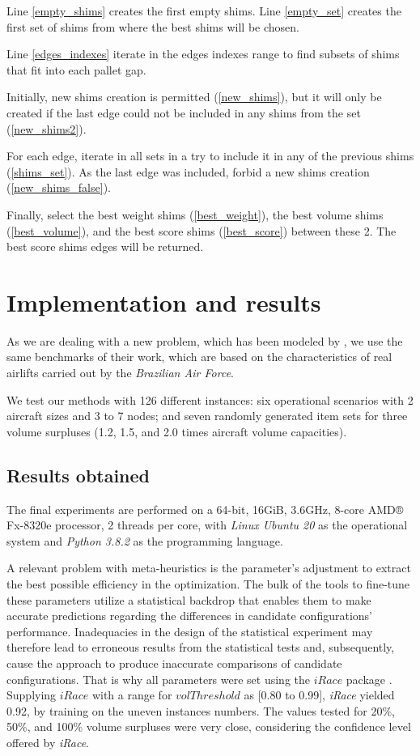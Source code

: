 \documentclass[preprint,authoryear]{elsarticle}
\begin{document}
Line \ref{empty_shims} creates the first empty shims.
Line \ref{empty_set} creates the first set of shims from where the best shims will be chosen.

Line \ref{edges_indexes} iterate in the edges indexes range to find subsets of shims that fit into each pallet gap.

Initially, new shims creation is permitted (\ref{new_shims}), but it will only be created if the last edge could not be included in any shims from the set (\ref{new_shims2}). 

For each edge, iterate in all sets in a try to include it in any of the previous shims (\ref{shims_set}).
As the last edge was included, forbid a new shims creation (\ref{new_shims_false}).

Finally, select the best weight shims (\ref{best_weight}), the best volume shims (\ref{best_volume}), and the best score shims (\ref{best_score}) between these 2. The best score shims edges will be returned.



\section{Implementation and results}
\label{sec6}


As we are dealing with a new problem, which has been modeled by \cite{MesquitaSanches2023}, we use the same benchmarks of their work, which are based on the characteristics of real airlifts carried out by the {\em Brazilian Air Force}.
 
We test our methods with 126 different instances: six operational scenarios with 2 aircraft sizes and 3 to 7 nodes; and seven randomly generated item sets for three volume surpluses (1.2, 1.5, and 2.0 times aircraft volume capacities).


\subsection{Results obtained}

The final experiments are performed on a 64-bit, 16GiB, 3.6GHz, 8-core AMD® Fx-8320e processor, 2 threads per core, with {\it Linux Ubuntu 20} as the operational system and {\it Python 3.8.2} as the programming language.

A relevant problem with meta-heuristics is the parameter's adjustment to extract the best possible efficiency in the optimization. The bulk of the tools to fine-tune these parameters utilize a statistical backdrop that enables them to make accurate predictions regarding the differences in candidate configurations' performance. Inadequacies in the design of the statistical experiment may therefore lead to erroneous results from the statistical tests and, subsequently, cause the approach to produce inaccurate comparisons of candidate configurations. That is why all parameters were set using the $iRace$ package \citep{LopezIbanezManuel2016}. Supplying $iRace$ with a range for $volThreshold$ as [0.80 to 0.99], {\it iRace} yielded 0.92, by training on the uneven instances numbers. The values tested for 20\%, 50\%, and 100\% volume surpluses were very close, considering the confidence level offered by {\it iRace}.
\end{document}
